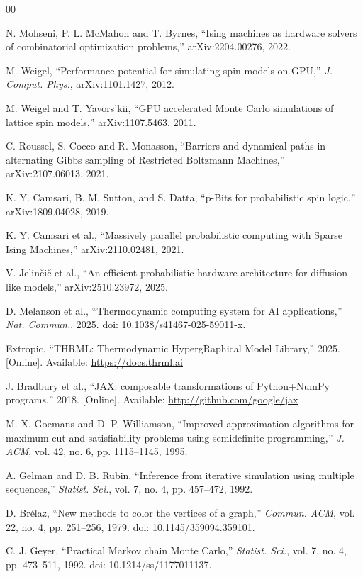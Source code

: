 \documentclass[conference]{IEEEtran}
\begin{document}
\begin{thebibliography}{00}

   N. Mohseni, P. L. McMahon and T. Byrnes, ``Ising machines as hardware solvers of combinatorial optimization problems,'' arXiv:2204.00276, 2022.

   M. Weigel, ``Performance potential for simulating spin models on GPU,'' \textit{J. Comput. Phys.}, arXiv:1101.1427, 2012.

   M. Weigel and T. Yavors'kii, ``GPU accelerated Monte Carlo simulations of lattice spin models,'' arXiv:1107.5463, 2011.

   C. Roussel, S. Cocco and R. Monasson, ``Barriers and dynamical paths in alternating Gibbs sampling of Restricted Boltzmann Machines,'' arXiv:2107.06013, 2021.

   K. Y. Camsari, B. M. Sutton, and S. Datta, ``p-Bits for probabilistic spin logic,'' arXiv:1809.04028, 2019.

   K. Y. Camsari et al., ``Massively parallel probabilistic computing with Sparse Ising Machines,'' arXiv:2110.02481, 2021.

   V. Jelinčič et al., ``An efficient probabilistic hardware architecture for diffusion-like models,'' arXiv:2510.23972, 2025.

   D. Melanson et al., ``Thermodynamic computing system for AI applications,'' \textit{Nat. Commun.}, 2025. doi: 10.1038/s41467-025-59011-x.

   Extropic, ``THRML: Thermodynamic HypergRaphical Model Library,'' 2025. [Online]. Available: \url{https://docs.thrml.ai}

   J. Bradbury et al., ``JAX: composable transformations of Python+NumPy programs,'' 2018. [Online]. Available: \url{http://github.com/google/jax}

   M. X. Goemans and D. P. Williamson, ``Improved approximation algorithms for maximum cut and satisfiability problems using semidefinite programming,'' \textit{J. ACM}, vol. 42, no. 6, pp. 1115--1145, 1995.

   A. Gelman and D. B. Rubin, ``Inference from iterative simulation using multiple sequences,'' \textit{Statist. Sci.}, vol. 7, no. 4, pp. 457--472, 1992.

   D. Brélaz, ``New methods to color the vertices of a graph,'' \textit{Commun. ACM}, vol. 22, no. 4, pp. 251--256, 1979. doi: 10.1145/359094.359101.

   C. J. Geyer, ``Practical Markov chain Monte Carlo,'' \textit{Statist. Sci.}, vol. 7, no. 4, pp. 473--511, 1992. doi: 10.1214/ss/1177011137.

\end{thebibliography}
\end{document}
